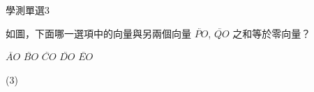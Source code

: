     \begin{QUESTION}
        \begin{ExamInfo}{91}{學測}{單選}{3}
        \end{ExamInfo}
        \begin{ExamAnsRateInfo}{62}{94}{65}{27}
        \end{ExamAnsRateInfo}
        \begin{QBODY}
            如圖，下面哪一選項中的向量與另兩個向量 $\lvec{PO}$, $\lvec{QO}$ 之和等於零向量？
            \begin{QOPS} 
                \QOP $\lvec{AO}$ 
                \QOP $\lvec{BO}$ 
                \QOP $\lvec{CO}$ 
                \QOP $\lvec{DO}$ 
                \QOP $\lvec{EO}$ 
            \end{QOPS}

        \end{QBODY}
        \begin{QFROMS}
        \end{QFROMS}
        \begin{QTAGS}\end{QTAGS}
        \begin{QANS}
            (3)
        \end{QANS}
        \begin{QSOLLIST}
        \end{QSOLLIST}
        \begin{QEMPTYSPACE}
        \end{QEMPTYSPACE}
    \end{QUESTION}
